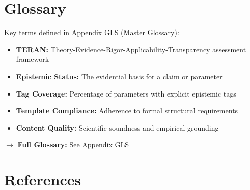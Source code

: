 \documentclass[11pt,a4paper]{article}
\begin{document}

\section*{Glossary}

Key terms defined in Appendix GLS (Master Glossary):
\begin{itemize}
    \item \textbf{TERAN:} Theory-Evidence-Rigor-Applicability-Transparency assessment framework
    \item \textbf{Epistemic Status:} The evidential basis for a claim or parameter
    \item \textbf{Tag Coverage:} Percentage of parameters with explicit epistemic tags
    \item \textbf{Template Compliance:} Adherence to formal structural requirements
    \item \textbf{Content Quality:} Scientific soundness and empirical grounding
\end{itemize}

$\rightarrow$ \textbf{Full Glossary:} See Appendix GLS


\section*{References}
\end{document}
